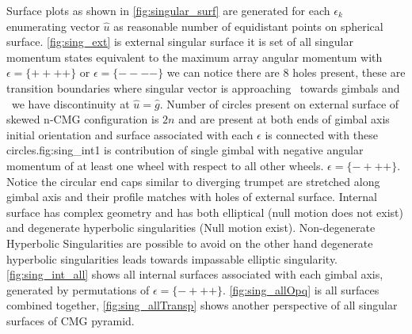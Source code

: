 Surface plots as shown in \autoref{fig:singular_surf} are generated for each ${\displaystyle \epsilon _{k}}$ enumerating vector ${\displaystyle \hat{u}}$ as reasonable number of equidistant points on spherical surface. \autoref{fig:sing_ext} is external singular surface it is set of all singular momentum states equivalent to the maximum array angular momentum with $\epsilon =\{++++\}$ or $\epsilon =\{----\}$ we can notice there are 8 holes present, these are transition boundaries where singular vector is approaching \ towards gimbals and \ we have discontinuity at ${\displaystyle \hat{u} =\hat{g}}$. Number of circles present on external surface of skewed n-CMG configuration is ${\displaystyle 2n}$ and are present at both ends of gimbal axis initial orientation and surface associated with each $\displaystyle \epsilon $ is connected with these circles.fig:sing\_int1 is contribution of single gimbal with negative angular momentum of at least one wheel with respect to all other wheels. $\epsilon =\{-+++\}$. Notice the circular end caps similar to diverging trumpet are stretched along gimbal axis and their profile matches with holes of external surface. Internal surface has complex geometry and has both elliptical (null motion does not exist) and degenerate hyperbolic singularities (Null motion exist). Non-degenerate Hyperbolic Singularities are possible to avoid on the other hand degenerate hyperbolic singularities leads towards impassable elliptic singularity. \autoref{fig:sing_int_all} shows all internal surfaces associated with each gimbal axis, generated by permutations of $\epsilon =\{-+++\}$. \autoref{fig:sing_allOpq} is all surfaces combined together, \autoref{fig:sing_allTransp} shows another perspective of all singular surfaces of CMG pyramid.

